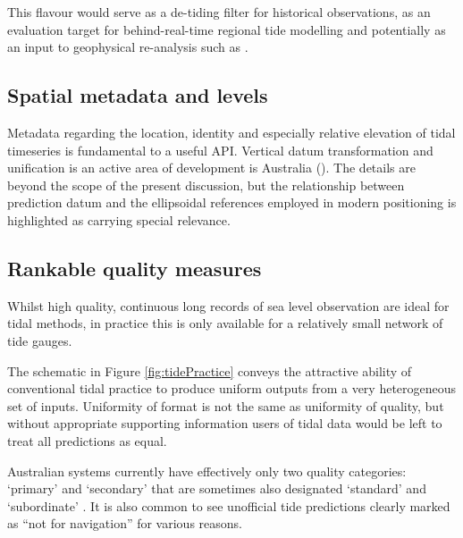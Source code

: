 This flavour would serve as a de-tiding filter for historical observations, as an evaluation target for behind-real-time regional tide modelling  \cite{10.5194/os-2020-107} and potentially as an input to geophysical re-analysis such as \cite{10.1029/2017jc013685}.

\subsection{Spatial metadata and levels}
Metadata regarding the location, identity and especially relative elevation of tidal timeseries is fundamental to a useful API.
Vertical datum transformation and unification is an active area of development is Australia (\cite{Keysers:we}\cite{Filmer:2018cu}\cite{AVWS2021}).   The details are beyond the scope of the present discussion, but the relationship between prediction datum and the ellipsoidal references employed in modern positioning is highlighted as carrying special relevance.

\subsection{Rankable quality measures}

Whilst high quality, continuous long records of sea level observation are ideal for tidal methods, in practice this is only available for a relatively small network of tide gauges.   

The schematic in Figure \ref{fig:tidePractice} conveys the attractive ability of conventional tidal practice to produce uniform outputs from a very heterogeneous set of inputs.
Uniformity of format is not the same as uniformity of quality, but without appropriate supporting information users of tidal data would be left to treat all predictions as equal.  

Australian systems currently have effectively only two quality categories: `primary' and `secondary' \cite{austides} that are sometimes also designated `standard' and `subordinate'  \cite{PCTMSL-sp9}.   
It is also common to see unofficial tide predictions clearly marked as ``not for navigation'' for various reasons.


